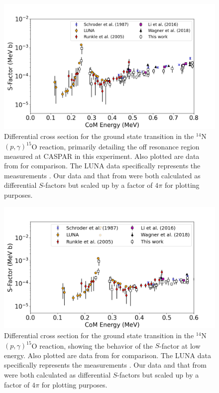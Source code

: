 \begin{figure}
		\includegraphics[width=1.0\linewidth]{figures/low_mid_gs.png}
	\caption{Differential cross section for the ground state transition in the $^{14}$N$\left( p,\gamma \right) ^{15}$O reaction, primarily detailing the off resonance region measured at CASPAR in this experiment. Also plotted are data from \cite{Schroder1987, Imbriani2005, Runkle2005, Li2016} for comparison. The LUNA data specifically represents the measurements \cite{Formicola2004, Imbriani2005, Marta2008, Marta2011}. Our data and that from \citet{Li2016} were both calculated as differential $S$-factors but scaled up by a factor of $4\pi$ for plotting purposes.    }
	\label{fig: midGS}
\end{figure}



\begin{figure}
		\includegraphics[width=1.0\linewidth]{figures/low_gs.png}
	\caption{Differential cross section for the ground state transition in the $^{14}$N$\left( p,\gamma \right) ^{15}$O reaction, showing the behavior of the $S$-factor at low energy. Also plotted are data from \cite{Schroder1987, Imbriani2005, Runkle2005, Li2016} for comparison. The LUNA data specifically represents the measurements \cite{Formicola2004, Imbriani2005, Marta2008, Marta2011}. Our data and that from \citet{Li2016} were both calculated as differential $S$-factors but scaled up by a factor of $4\pi$ for plotting purposes. }
	\label{fig: lowGS}
\end{figure}

